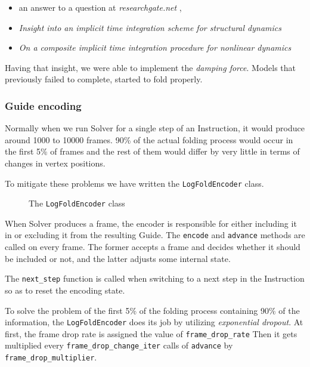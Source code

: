 \begin{itemize}
	\item an answer to a question at \textit{researchgate.net} \cite{researchgate:what-is-damping},
	\item \textit{Insight into an implicit time integration scheme for structural dynamics} \cite{damping1}
	\item \textit{On a composite implicit time integration procedure for nonlinear dynamics} \cite{damping2}
\end{itemize}

Having that insight, we were able to implement the \textit{damping force}. Models that previously failed to complete, started to fold properly.
\subsubsection{Guide encoding}

Normally when we run Solver for a single step of an Instruction, it would produce around 
1000 to 10000 frames.
90\% of the actual folding process would occur in the first 5\% of frames and the rest of them would differ by very little in terms of changes in vertex positions.

To mitigate these problems we have written the \texttt{LogFoldEncoder} class.

\begin{figure}[H]
	\caption{The \texttt{LogFoldEncoder} class}
	
\end{figure}

When Solver produces a frame, the encoder is responsible for either including it in or excluding it from the resulting Guide.
The \texttt{encode} and \texttt{advance} methods are called on every frame.
The former accepts a frame and decides whether it should be included or not, 
and the latter adjusts some internal state.

The \texttt{next\_step} function is called when switching to a next step in the Instruction so as to reset the encoding state.

To solve the problem of the first 5\% of the folding process containing 90\% of the information, the
\texttt{LogFoldEncoder} does its job by utilizing \textit{exponential dropout}.
At first, the frame drop rate is assigned the value of \texttt{frame\_drop\_rate}
Then it gets multiplied every \texttt{frame\_drop\_change\_iter} calls of \texttt{advance}
by \texttt{frame\_drop\_multiplier}.

